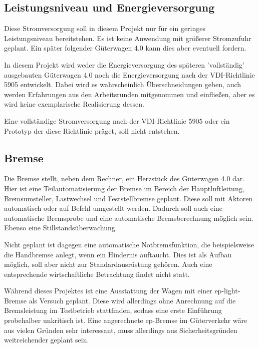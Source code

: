 \subsection{Leistungsniveau und Energieversorgung}
Diese Stromversorgung soll in diesem Projekt nur für ein geringes Leistungsniveau bereitstehen. Es ist keine Anwendung mit größerer Stromzufuhr geplant. Ein später folgender Güterwagen 4.0  kann dies aber eventuell fordern.\par
In diesem Projekt wird weder die Energieversorgung des späteren 'vollständig' ausgebauten Güterwagen 4.0 noch die Energieversorgung nach der VDI-Richtlinie 5905 entwickelt. Dabei wird es wahrscheinlich Überschneidungen geben, auch werden Erfahrungen aus den Arbeitsrunden mitgenommen und einfließen, aber es wird keine exemplarische Realisierung dessen.\par
Eine vollständige Stromversorgung nach der VDI-Richtlinie 5905 oder ein Prototyp der diese Richtlinie präget, soll nicht entstehen. 

\subsection{Bremse}
Die Bremse stellt, neben dem Rechner, ein Herzstück des Güterwagen 4.0  dar.
Hier ist eine Teilautomatisierung der Bremse im Bereich der Hauptluftleitung, Bremsumsteller, Lastwechsel und Feststellbremse geplant. Diese soll mit Aktoren automatisch oder auf Befehl umgestellt werden. Dadurch soll auch eine automatische Bremsprobe und eine automatische Bremsberechnung möglich sein. Ebenso eine Stillstandsüberwachung.\par
Nicht geplant ist dagegen eine automatische Notbremsfunktion, die beispielsweise die Handbremse anlegt, wenn ein Hindernis auftaucht. Dies ist als Aufbau möglich, soll aber nicht zur Standardausrüstung gehören. Auch eine entsprechende wirtschaftliche Betrachtung findet nicht statt.\par
Während dieses Projektes ist eine Ausstattung der Wagen mit einer ep-light-Bremse als Versuch geplant. Diese wird allerdings ohne Anrechnung auf die Bremsleistung im Testbetrieb stattfinden, sodass eine erste Einführung probehalber unkritisch ist. Eine angerechnete ep-Bremse im Güterverkehr wäre aus vielen Gründen sehr interessant, muss allerdings aus Sicherheitsgründen weitreichender geplant sein.\par

